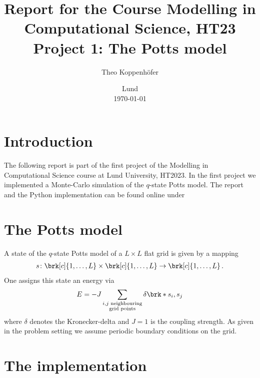 




\title{ Report for the Course Modelling in Computational Science, HT23 \\[1ex]
	  \large Project 1: The Potts model}
\author{Theo Koppenhöfer}
\date{Lund \\[1ex] \today}



\usepackage{pythonhighlight}
\graphicspath{{../Figures/}}





\maketitle

\section{Introduction}

The following report is part of the first project of the Modelling in Computational Science course at Lund University, HT2023.
In the first project we implemented a Monte-Carlo simulation of the $q$-state Potts model.
The report and the Python implementation can be found online under \cite{Repository}

\section{The Potts model}

A state of the $q$-state Potts model of a $L\times L$ flat grid is given by a mapping
\begin{align*}
	s\colon \brk[c]{1,\dots,L}\times\brk[c]{1,\dots,L}\to\brk[c]{1,\dots,L}\,.
\end{align*}
One assigns this state an energy via
\begin{align*}
	E = -J\sum_{\substack{i, j\text{ neighbouring}\\ \text{grid points}}}\delta\brk*{s_i,s_j}
\end{align*}
where $\delta$ denotes the Kronecker-delta and $J=1$ is the coupling strength. As given in the problem setting we assume periodic boundary conditions on the grid.

\section{The implementation}

